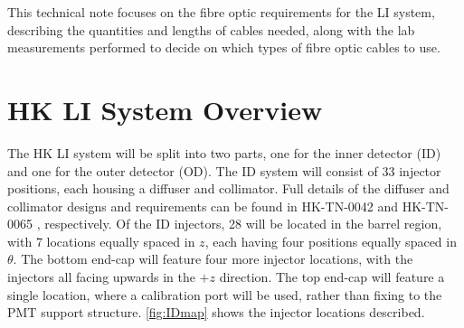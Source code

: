 \documentclass[a4paper,11pt]{article}
\begin{document}
This technical note focuses on the fibre optic requirements for the LI system, describing the quantities and lengths of cables needed, along with the lab measurements performed to decide on which types of fibre optic cables to use.

\section{HK LI System Overview}\label{sec:overview}

The HK LI system will be split into two parts, one for the inner detector (ID) and one for the outer detector (OD). The ID system will consist of 33 injector positions, each housing a diffuser and collimator. Full details of the diffuser and collimator designs and requirements can be found in HK-TN-0042 \cite{bib:tn0042} and HK-TN-0065 \cite{bib:tn0065}, respectively. Of the ID injectors, 28 will be located in the barrel region, with 7 locations equally spaced in $z$, each having four positions equally spaced in $\theta$. The bottom end-cap will feature four more injector locations, with the injectors all facing upwards in the $+z$ direction. The top end-cap will feature a single location, where a calibration port will be used, rather than fixing to the PMT support structure. \cref{fig:IDmap} shows the injector locations described.
\end{document}

